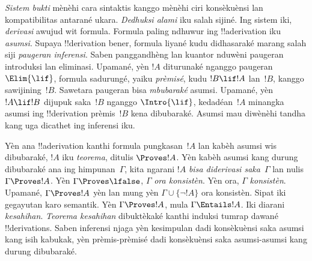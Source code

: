 \emph{Sistem bukti} mènèhi cara sintaktis kanggo mènèhi ciri
konsèkuènsi lan kompatibilitas antarané ukara. \emph{Dedhuksi
alami} iku salah sijiné. Ing sistem iki, \emph{derivasi} awujud
wit formula. Formula paling ndhuwur ing !!a{derivation} iku
\emph{asumsi}. Supaya !!{derivation} bener, formula liyané
kudu didhasaraké marang salah siji \emph{paugeran
inferensi}. Saben panggandhèng lan kuantor nduwèni paugeran
introduksi lan eliminasi. Upamané, yèn $!A$ diturunaké nganggo
paugeran $\Elim{\lif}$, formula sadurungé, yaiku \emph{prèmisé},
kudu $!B\lif !A$ lan~$!B$, kanggo sawijining~$!B$.
Sawetara paugeran bisa \emph{mbubaraké} asumsi. Upamané, yèn
$!A\lif !B$ dijupuk saka~$!B$ nganggo $\Intro{\lif}$,
kedadéan~$!A$ minangka asumsi ing !!{derivation} prèmis~$!B$
kena dibubaraké. Asumsi mau diwènèhi tandha kang uga dicathet
ing inferensi iku.

Yèn ana !!a{derivation} kanthi formula pungkasan~$!A$ lan
kabèh asumsi wis dibubaraké, $!A$ iku \emph{teorema},
ditulis $\Proves !A$. Yèn kabèh asumsi kang durung dibubaraké
ana ing himpunan~$\Gamma$, kita ngarani $!A$ \emph{bisa diderivasi
saka}~$\Gamma$ lan nulis $\Gamma\Proves !A$. Yèn
$\Gamma\Proves\lfalse$, $\Gamma$ \emph{ora konsistèn}.
Yèn ora, $\Gamma$ \emph{konsistèn}. Upamané, $\Gamma\Proves !A$
yèn lan mung yèn $\Gamma\cup\{\lnot !A\}$ ora konsistèn.
Sipat iki gegayutan karo semantik. Yèn $\Gamma\Proves !A$,
mula $\Gamma\Entails !A$. Iki diarani \emph{kesahihan}.
\emph{Teorema kesahihan} dibuktèkaké kanthi induksi tumrap
dawané !!{derivation}s. Saben inferensi njaga yèn kesimpulan
dadi konsèkuènsi saka asumsi kang isih kabukak, yèn prèmis-prèmisé
dadi konsèkuènsi saka asumsi-asumsi kang durung dibubaraké.
